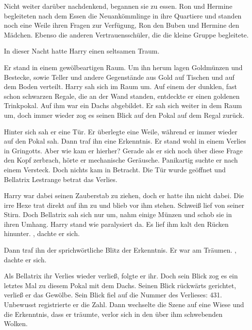 Nicht weiter darüber nachdenkend, begannen sie zu essen. Ron und Hermine begleiteten nach dem Essen die Neuankömmlinge in ihre Quartiere und standen noch eine Weile ihren Fragen zur Verfügung, Ron den Buben und Hermine den Mädchen. Ebenso die anderen Vertrauensschüler, die die kleine Gruppe begleitete.

\trenn

In dieser Nacht hatte Harry einen seltsamen Traum.

\begin{traum}
Er stand in einem gewölbeartigen Raum. Um ihn herum lagen Goldmünzen und Bestecke, sowie Teller und andere Gegenstände aus Gold auf Tischen und auf dem Boden verteilt. Harry sah sich im Raum um. Auf einem der dunklen, fast schon schwarzen Regale, die an der Wand standen, entdeckte er einen goldenen Trinkpokal. Auf ihm war ein Dachs abgebildet. Er sah sich weiter in dem Raum um, doch immer wieder zog es seinen Blick auf den Pokal auf dem Regal zurück.

Hinter sich sah er eine Tür. Er überlegte eine Weile, während er immer wieder auf den Pokal sah. Dann traf ihn eine Erkenntnis. Er stand wohl in einem Verlies in Gringotts. Aber wie kam er hierher? Gerade als er sich noch über diese Frage den Kopf zerbrach, hörte er mechanische Geräusche. Panikartig suchte er nach einem Versteck. Doch nichts kam in Betracht. Die Tür wurde geöffnet und Bellatrix Lestrange betrat das Verlies.

Harry war dabei seinen Zauberstab zu ziehen, doch er hatte ihn nicht dabei. Die irre Hexe trat direkt auf ihn zu und blieb vor ihm stehen. Schweiß lief von seiner Stirn. Doch Bellatrix sah sich nur um, nahm einige Münzen und schob sie in ihren Umhang. Harry stand wie paralysiert da. Es lief ihm kalt den Rücken hinunter. , dachte er sich.

Dann traf ihn der sprichwörtliche Blitz der Erkenntnis. Er war am Träumen. , dachte er sich.

Als Bellatrix ihr Verlies wieder verließ, folgte er ihr. Doch sein Blick zog es ein letztes Mal zu diesem Pokal mit dem Dachs. Seinen Blick rückwärts gerichtet, verließ er das Gewölbe. Sein Blick fiel auf die Nummer des Verlieses: 431. Unbewusst registrierte er die Zahl. Dann wechselte die Szene auf eine Wiese und die Erkenntnis, dass er träumte, verlor sich in den über ihm schwebenden Wolken.
\end{traum}

